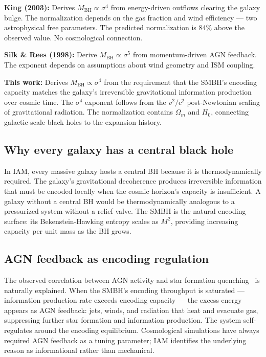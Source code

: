 \documentclass[12pt,a4paper]{article}
\begin{document}
\textbf{King (2003):} Derives $M_\mathrm{BH} \propto \sigma^4$ from energy-driven
outflows clearing the galaxy bulge. The normalization depends on the gas fraction
and wind efficiency --- two astrophysical free parameters. The predicted
normalization is 84\% above the observed value. No cosmological connection.

\textbf{Silk \& Rees (1998):} Derive $M_\mathrm{BH} \propto \sigma^5$ from
momentum-driven AGN feedback. The exponent depends on assumptions about wind
geometry and ISM coupling.

\textbf{This work:} Derives $M_\mathrm{BH} \propto \sigma^4$ from the requirement
that the SMBH's encoding capacity matches the galaxy's irreversible gravitational
information production over cosmic time. The $\sigma^4$ exponent follows from the
$v^2/c^2$ post-Newtonian scaling of gravitational radiation. The normalization
contains $\Omega_m$ and $H_0$, connecting galactic-scale black holes to the
expansion history.

\subsection{Why every galaxy has a central black hole}

In IAM, every massive galaxy hosts a central BH because it is thermodynamically
required. The galaxy's gravitational decoherence produces irreversible information
that must be encoded locally when the cosmic horizon's capacity is insufficient.
A galaxy without a central BH would be thermodynamically analogous to a pressurized
system without a relief valve. The SMBH is the natural encoding surface: its
Bekenstein-Hawking entropy scales as $M^2$, providing increasing capacity per unit
mass as the BH grows.

\subsection{AGN feedback as encoding regulation}

The observed correlation between AGN activity and star formation
quenching~\citep{Fabian2012} is naturally explained. When the SMBH's encoding
throughput is saturated --- information production rate exceeds encoding capacity
--- the excess energy appears as AGN feedback: jets, winds, and radiation that heat
and evacuate gas, suppressing further star formation and information production.
The system self-regulates around the encoding equilibrium. Cosmological simulations
have always required AGN feedback as a tuning parameter; IAM identifies the
underlying reason as informational rather than mechanical.
\end{document}
